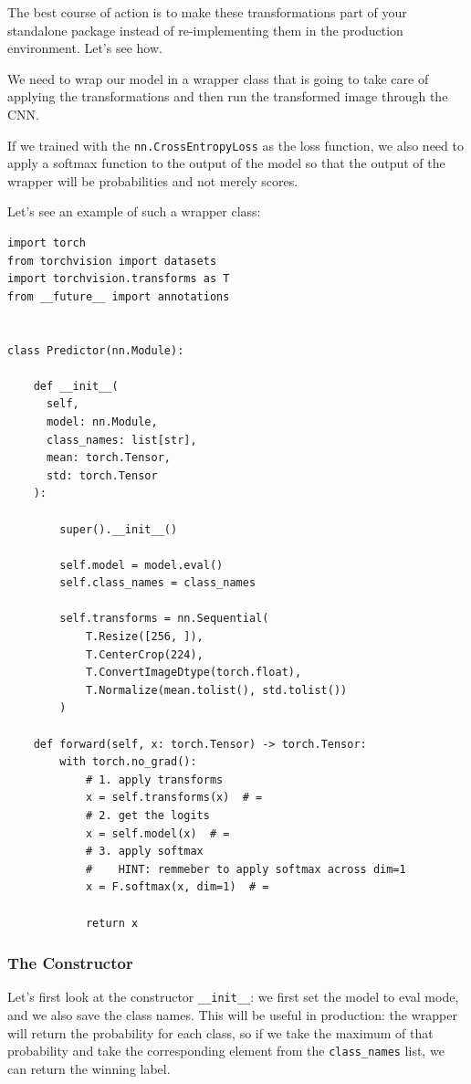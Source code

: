 The best course of action is to make these transformations part of your standalone package instead of re-implementing them in the production environment. Let's see how.\newline

We need to wrap our model in a wrapper class that is going to take care of applying the transformations and then run the transformed image through the CNN.

If we trained with the \lstinline{nn.CrossEntropyLoss} as the loss function, we also need to apply a softmax function to the output of the model so that the output of the wrapper will be probabilities and not merely scores.\newline

Let's see an example of such a wrapper class:
\begin{lstlisting}
import torch
from torchvision import datasets
import torchvision.transforms as T
from __future__ import annotations


class Predictor(nn.Module):

    def __init__(
      self, 
      model: nn.Module, 
      class_names: list[str], 
      mean: torch.Tensor, 
      std: torch.Tensor
    ):

        super().__init__()

        self.model = model.eval()
        self.class_names = class_names

        self.transforms = nn.Sequential(
            T.Resize([256, ]),
            T.CenterCrop(224),
            T.ConvertImageDtype(torch.float),
            T.Normalize(mean.tolist(), std.tolist())
        )

    def forward(self, x: torch.Tensor) -> torch.Tensor:
        with torch.no_grad():
            # 1. apply transforms
            x = self.transforms(x)  # =
            # 2. get the logits
            x = self.model(x)  # =
            # 3. apply softmax
            #    HINT: remmeber to apply softmax across dim=1
            x = F.softmax(x, dim=1)  # =

            return x
\end{lstlisting}

\subsubsection{The Constructor}

Let's first look at the constructor \lstinline{__init__}: we first set the model to eval mode, and we also save the class names. This will be useful in production: the wrapper will return the probability for each class, so if we take the maximum of that probability and take the corresponding element from the \lstinline{class_names} list, we can return the winning label.

